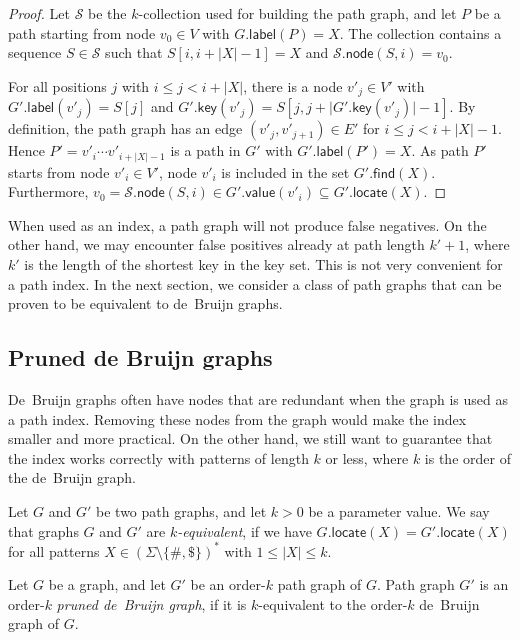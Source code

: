 \documentclass[a4paper,UKenglish]{lipics-v2016}
\newcommand{\set}[1]{\ensuremath{\{ #1 \}}}
\newcommand{\abs}[1]{\ensuremath{\lvert #1 \rvert}}
\newcommand{\find}{\ensuremath{\mathsf{find}}}
\newcommand{\locate}{\ensuremath{\mathsf{locate}}}
\newcommand{\glabel}{\ensuremath{\mathsf{label}}}
\newcommand{\gkey}{\ensuremath{\mathsf{key}}}
\newcommand{\gvalue}{\ensuremath{\mathsf{value}}}
\newcommand{\gnode}{\ensuremath{\mathsf{node}}}
\newcommand{\kcollection}[1]{$#1$\nobreakdash-collection}
\newcommand{\kequivalent}[1]{$#1$\nobreakdash-equivalent}
\newcommand{\orderk}[1]{order\nobreakdash-$#1$}
\begin{document}
\begin{proof}
Let $\mathcal{S}$ be the \kcollection{k} used for building the path graph, and let $P$ be a path starting from node $v_{0} \in V$ with $G.\glabel(P) = X$. The collection contains a sequence $S \in \mathcal{S}$ such that $S[i, i+\abs{X}-1] = X$ and $\mathcal{S}.\gnode(S, i) = v_{0}$.

For all positions $j$ with $i \le j < i+\abs{X}$, there is a node $v'_{j} \in V'$ with $G'.\glabel(v'_{j}) = S[j]$ and $G'.\gkey(v'_{j}) = S[j, j+\abs{G'.\gkey(v'_{j})}-1]$.
By definition, the path graph has an edge $(v'_{j}, v'_{j+1}) \in E'$ for $i \le j < i+\abs{X}-1$.
Hence $P' = v'_{i} \dotsm v'_{i+\abs{X}-1}$ is a path in $G'$ with $G'.\glabel(P') = X$.
As path $P'$ starts from node $v'_{i} \in V'$, node $v'_{i}$ is included in the set $G'.\find(X)$.
Furthermore, $v_{0} = \mathcal{S}.\gnode(S, i) \in G'.\gvalue(v'_{i}) \subseteq G'.\locate(X)$.
\end{proof}

When used as an index, a path graph will not produce false negatives. On the other hand, we may encounter false positives already at path length $k'+1$, where $k'$ is the length of the shortest key in the key set. This is not very convenient for a path index. In the next section, we consider a class of path graphs that can be proven to be equivalent to de~Bruijn graphs.


\subsection{Pruned de Bruijn graphs}

De~Bruijn graphs often have nodes that are redundant when the graph is used as a path index. Removing these nodes from the graph would make the index smaller and more practical. On the other hand, we still want to guarantee that the index works correctly with patterns of length $k$ or less, where $k$ is the order of the de~Bruijn graph.

\begin{definition}
Let $G$ and $G'$ be two path graphs, and let $k > 0$ be a parameter value. We say that graphs $G$ and $G'$ are \emph{\kequivalent{k}}, if we have $G.\locate(X) = G'.\locate(X)$ for all patterns $X \in (\Sigma \setminus \set{\#, \$})^{\ast}$ with $1 \le \abs{X} \le k$.
\end{definition}

\begin{definition}
Let $G$ be a graph, and let $G'$ be an \orderk{k} path graph of $G$. Path graph $G'$ is an \orderk{k} \emph{pruned de~Bruijn graph}, if it is \kequivalent{k} to the \orderk{k} de~Bruijn graph of $G$.
\end{definition}
\end{document}
